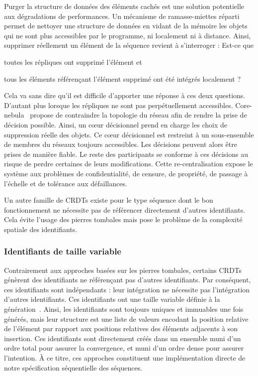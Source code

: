 Purger la structure de données des éléments cachés est une solution potentielle
aux dégradations de performances. Un mécanisme de ramasse-miettes
réparti~\cite{abdullahi1998garbage} permet de nettoyer une structure de données
en vidant de la mémoire les objets qui ne sont plus accessibles par le
programme, ni localement ni à distance. Ainsi, supprimer réellement un élément
de la séquence revient à s'interroger : \og Est-ce que
\begin{inparaenum}[(i)]
\item toutes les répliques ont supprimé l'élément et
\item tous les éléments référençant l'élément supprimé ont été intégrés
  localement ?
\end{inparaenum}\fg Cela va sans dire qu'il est difficile d'apporter une réponse
à ces deux questions. D'autant plus lorsque les répliques ne sont pas
perpétuellement accessibles. Core-nebula~\cite{letia2009crdts} propose de
contraindre la topologie du réseau afin de rendre la prise de décision
possible. Ainsi, un cœur décisionnel prend en charge les choix de suppression
réelle des objets.  Ce cœur décisionnel est restreint à un sous-ensemble de
membres du réseaux toujours accessibles. Les décisions peuvent alors être prises
de manière fiable. Le reste des participants se conforme à ces décisions au
risque de perdre certaines de leurs modifications. Cette re-centralisation
expose le système aux problèmes de confidentialité, de censure, de propriété, de
passage à l'échelle et de tolérance aux défaillances.
 
Un autre famille de CRDTs existe pour le type séquence dont le bon
fonctionnement ne nécessite pas de référencer directement d'autres
identifiants. Cela évite l'usage des pierres tombales mais pose le problème de
la complexité spatiale des identifiants.

\subsubsection{Identifiants de taille variable}
\label{repl:subsubsec:variable}

Contrairement aux approches basées sur les pierres tombales, certains CRDTs
génèrent des identifiants ne référençant pas d'autres identifiants. Par
conséquent, ces identifiants sont indépendants : leur intégration ne nécessite
pas l'intégration d'autres identifiants. Ces identifiants ont une taille
variable définie à la génération~\cite{andre2013supporting,
  preguica2009commutative, weiss2009logoot}.  Ainsi, les identifiants sont
toujours uniques et immuables une fois générés, mais leur structure est une
liste de valeurs encodant la position relative de l'élément par rapport aux
positions relatives des éléments adjacents à son insertion. Ces identifiants
sont directement créés dans un ensemble muni d'un ordre total pour assurer la
convergence, et muni d'un ordre dense pour assurer l'intention. À ce titre, ces
approches constituent une implémentation directe de notre spécification
séquentielle des séquences.


